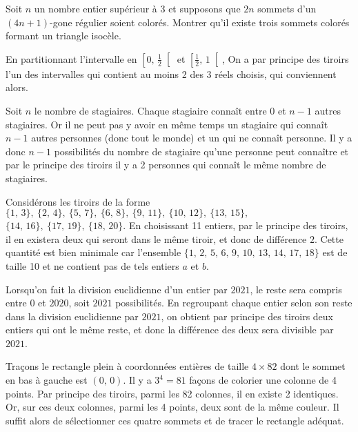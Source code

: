 \begin{exo}
Soit $n$ un nombre entier supérieur à 3 et supposons que $2n$ sommets d'un $(4n + 1)$-gone régulier soient colorés. Montrer qu'il existe trois sommets colorés formant un triangle isocèle.
\end{exo}

\bigskip



\begin{sol}
En partitionnant l'intervalle en $\left[0, \, \frac12\right[$ et $\left[\frac12, \, 1\right[$, On a par principe des tiroirs l'un des intervalles qui contient au moins 2 des 3 réels choisis, qui conviennent alors.
\end{sol}


\begin{sol}
Soit $n$ le nombre de stagiaires. Chaque stagiaire connaît entre $0$ et $n - 1$ autres stagiaires. Or il ne peut pas y avoir en même temps un stagiaire qui connaît $n - 1$ autres personnes (donc tout le monde) et un qui ne connaît personne. Il y a donc $n-1$ possibilités du nombre de stagiaire qu'une personne peut connaître et par le principe des tiroirs il y a 2 personnes qui connaît le même nombre de stagiaires.
\end{sol}


\begin{sol}
Considérons les tiroirs de la forme $\{1, \, 3\}, \ \{2, \, 4\}, \ \{5, \, 7\}, \ \{6, \, 8\}, \ \{9, \, 11\}, \ \{10, \, 12\}, \ \{13, \, 15\},$ $\{14, \, 16\}, \ \{17, \, 19\}, \ \{18, \, 20\}$. En choisissant 11 entiers, par le principe des tiroirs, il en existera deux qui seront dans le même tiroir, et donc de différence $2$. Cette quantité est bien minimale car l'ensemble $\{1, \, 2, \, 5, \, 6, \, 9, \, 10, \, 13, \, 14, \, 17, \, 18\}$ est de taille 10 et ne contient pas de tels entiers $a$ et $b$.
\end{sol}


\begin{sol}
Lorsqu'on fait la division euclidienne d'un entier par $2021$, le reste sera compris entre $0$ et $2020$, soit $2021$ possibilités. En regroupant chaque entier selon son reste dans la division euclidienne par $2021$, on obtient par principe des tiroirs deux entiers qui ont le même reste, et donc la différence des deux sera divisible par $2021$.
\end{sol}


\begin{sol}
Traçons le rectangle plein à coordonnées entières de taille $4 \times 82$ dont le sommet en bas à gauche est $(0, \, 0)$. Il y a $3^4 = 81$ façons de colorier une colonne de 4 points. Par principe des tiroirs, parmi les 82 colonnes, il en existe 2 identiques. Or, sur ces deux colonnes, parmi les 4 points, deux sont de la même couleur. Il suffit alors de sélectionner ces quatre sommets et de tracer le rectangle adéquat.
\end{sol}


